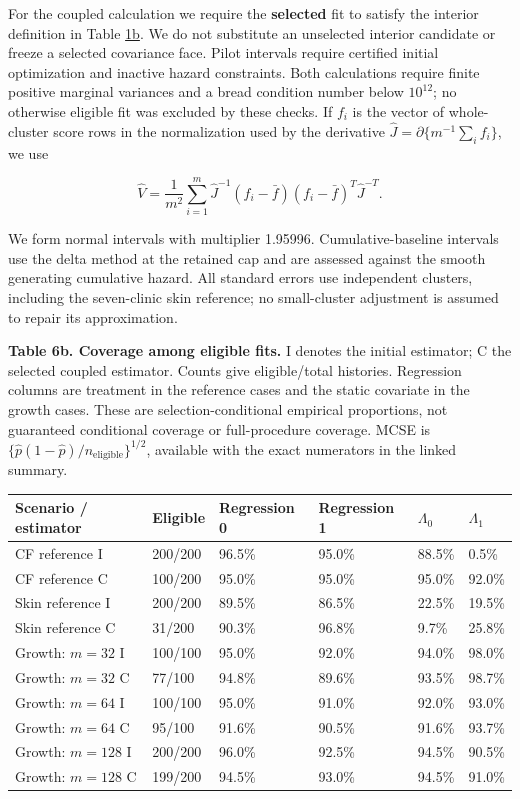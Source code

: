 \documentclass[11pt]{article}
\begin{document}
For the coupled calculation we require the \textbf{selected} fit to satisfy the interior definition in Table \hyperref[tab:1b]{1b}. We do not substitute an unselected interior candidate or freeze a selected covariance face. Pilot intervals require certified initial optimization and inactive hazard constraints. Both calculations require finite positive marginal variances and a bread condition number below \(10^{12}\); no otherwise eligible fit was excluded by these checks. If \(f_i\) is the vector of whole-cluster score rows in the normalization used by the derivative \(\widehat J=\partial\{m^{-1}\sum_i f_i\}\), we use

\begin{equation*}
\widehat V=\frac{1}{m^2}\sum_{i=1}^m
\widehat J^{-1}(f_i-\bar f)(f_i-\bar f)^T\widehat J^{-T}.
\end{equation*}

We form normal intervals with multiplier 1.95996. Cumulative-baseline intervals use the delta method at the retained cap and are assessed against the smooth generating cumulative hazard. All standard errors use independent clusters, including the seven-clinic skin reference; no small-cluster adjustment is assumed to repair its approximation.

\label{tab:6b}
\textbf{Table 6b. Coverage among eligible fits.} I denotes the initial estimator; C the selected coupled estimator. Counts give eligible/total histories. Regression columns are treatment in the reference cases and the static covariate in the growth cases. These are selection-conditional empirical proportions, not guaranteed conditional coverage or full-procedure coverage. MCSE is \(\{\widehat p(1-\widehat p)/n_{\mathrm{eligible}}\}^{1/2}\), available with the exact numerators in the linked summary.

{\small
\begin{longtable}{llllll}
\toprule
\textbf{Scenario / estimator} & \textbf{Eligible} & \textbf{Regression 0} & \textbf{Regression 1} & \textbf{\(\Lambda_0\)} & \textbf{\(\Lambda_1\)} \\
\midrule
\endhead
\bottomrule
\endlastfoot
CF reference I & 200/200 & 96.5\% & 95.0\% & 88.5\% & 0.5\% \\
CF reference C & 100/200 & 95.0\% & 95.0\% & 95.0\% & 92.0\% \\
Skin reference I & 200/200 & 89.5\% & 86.5\% & 22.5\% & 19.5\% \\
Skin reference C & 31/200 & 90.3\% & 96.8\% & 9.7\% & 25.8\% \\
Growth: \(m=32\) I & 100/100 & 95.0\% & 92.0\% & 94.0\% & 98.0\% \\
Growth: \(m=32\) C & 77/100 & 94.8\% & 89.6\% & 93.5\% & 98.7\% \\
Growth: \(m=64\) I & 100/100 & 95.0\% & 91.0\% & 92.0\% & 93.0\% \\
Growth: \(m=64\) C & 95/100 & 91.6\% & 90.5\% & 91.6\% & 93.7\% \\
Growth: \(m=128\) I & 200/200 & 96.0\% & 92.5\% & 94.5\% & 90.5\% \\
Growth: \(m=128\) C & 199/200 & 94.5\% & 93.0\% & 94.5\% & 91.0\% \\
\end{longtable}}
\end{document}
